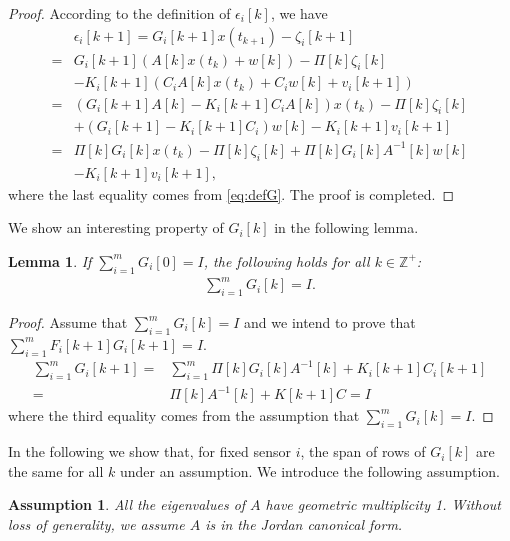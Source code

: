 \documentclass[12pt]{article}
\newcommand{\Zb}{{\mathbb{Z}}}
\newtheorem{lemma}{\textbf{Lemma}}
\newtheorem{assumption}{\textbf{Assumption}}
\newtheorem*{proof}{\textbf{Proof}}
\begin{document}
\begin{proof}
According to the definition of $\epsilon_i[k]$, we have
\begin{align*}
	&\epsilon_{i}[k+1] =
	G_{i}[k+1] x(t_{k+1})-\zeta_{i}[k+1] \\
	=& G_{i}[k+1] \left(A[k] x(t_k)+ w[k]\right)-\Pi[k]\zeta_{i}[k] \\
	&-K_i[k+1]\left(C_i A[k] x(t_k)+C_i w[k]+v_{i}[k+1]\right) \\
	=&\left(G_{i}[k+1] A[k]-K_i[k+1] C_i A[k]\right) x(t_k)-\Pi[k] \zeta_{i}[k] \\
	&+\left(G_{i}[k+1]-K_i[k+1] C_i\right) w[k]-K_i[k+1] v_{i}[k+1] \\
	=&\Pi[k] G_{i}[k] x(t_k)-\Pi[k] \zeta_{i}[k] +\Pi[k] G_i[k] A^{-1}[k] w[k]\\
	&-K_i[k+1] v_{i}[k+1],
\end{align*}
where the last equality comes from \eqref{eq:defG}. The proof is completed.
\end{proof}
We show an interesting property of $G_i[k]$ in the following lemma.
\begin{lemma}
	If $\sum_{i=1}^{m} G_i[0]=I$, the following holds for all $k\in\Zb^+$:
	\begin{align}
	\sum_{i=1}^{m} G_i[k]=I.
	\end{align}
\end{lemma}
\begin{proof}
	Assume that $\sum_{i=1}^{m} G_i[k]=I$ and we intend to prove that $\sum_{i=1}^{m} F_i[k+1]G_i[k+1]=I$.
	\begin{align*}
	\sum_{i=1}^{m} G_i[k+1]
	=&\sum_{i=1}^{m} \Pi[k] G_i[k] A^{-1}[k]+K_i[k+1]C_i[k+1]\\
	=& \Pi[k]A^{-1}[k]+K[k+1]C = I
	\end{align*}
	where the third equality comes from the assumption that $\sum_{i=1}^{m} G_i[k]=I$.
\end{proof}

In the following we show that, for fixed sensor $i$, the span of rows of $G_i[k]$ are the same for all $k$ under an assumption. 
We introduce the following assumption.
\begin{assumption}\label{as:geo_mul}
	All the eigenvalues of $A$ have geometric multiplicity 1.
	Without loss of generality, we assume $A$ is in the Jordan canonical form.
\end{assumption}
\end{document}
